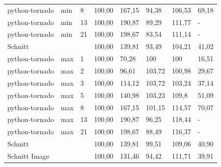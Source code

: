 \begin{footnotesize}
\begin{longtable}{llllllll}
		python-tornado & min     & 8          & 100,00 & 167,15                      & 94,38                       & 106,53                      & 69,18                       \\
		python-tornado & min     & 13         & 100,00 & 190,87                      & 89,29                       & 111,77                      & -                           \\
		python-tornado & min     & 21         & 100,00 & 198,67                      & 83,54                       & 111,14                      & -                           \\ \hline
		Schnitt        &         &            & 100,00 & 139,81                      & 93,49                       & 104,21                      & 41,02                       \\ \hline
		python-tornado & max     & 1          & 100,00 & 70,28                       & \cellcolor[HTML]{C0C0C0}100 & \cellcolor[HTML]{C0C0C0}100 & 16,51                       \\
		python-tornado & max     & 2          & 100,00 & 96,61                       & 103,72                      & 100,98                      & 29,67                       \\
		python-tornado & max     & 3          & 100,00 & 114,12                      & 103,72                      & 103,24                      & 37,14                       \\
		python-tornado & max     & 5          & 100,00 & 140,98                      & 103,23                      & 109,8                       & 51,09                       \\
		python-tornado & max     & 8          & 100,00 & 167,15                      & 101,15                      & 114,57                      & 70,07                       \\
		python-tornado & max     & 13         & 100,00 & 190,87                      & 96,25                       & 118,44                      & -                           \\
		python-tornado & max     & 21         & 100,00 & 198,67                      & 88,49                       & 116,37                      & -                           \\ \hline
		Schnitt        &         &            & 100,00 & 139,81                      & 99,51                       & 109,06                      & 40,90                       \\ \hline
		Schnitt Image  &         &            & 100,00 & 131,46                      & 94,42                       & 111,71                      & 39,91                       \\ \hline

\end{longtable}
\end{footnotesize}
